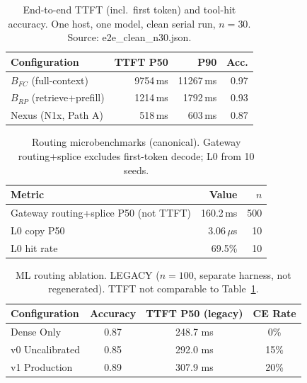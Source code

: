 %

\begin{table}[t]
\centering
\caption{End-to-end TTFT (incl.\ first token) and tool-hit accuracy. One host,
one model, clean serial run, $n{=}30$. Source: e2e\_clean\_n30.json.}
\label{tab:e2e-macro}
\begin{tabular}{lrrr}
\toprule
Configuration & TTFT P50 & P90 & Acc. \\
\midrule
$B_{FC}$ (full-context) & 9754\,ms & 11267\,ms & 0.97 \\
$B_{RP}$ (retrieve+prefill) & 1214\,ms & 1792\,ms & 0.93 \\
Nexus (N1x, Path A) & 518\,ms & 603\,ms & 0.87 \\
\bottomrule
\end{tabular}
\end{table}

\begin{table}[t]
\centering
\caption{Routing microbenchmarks (canonical). Gateway routing+splice excludes
first-token decode; L0 from 10 seeds.}
\label{tab:routing-micro}
\begin{tabular}{lrr}
\toprule
Metric & Value & $n$ \\
\midrule
Gateway routing+splice P50 (not TTFT) & 160.2\,ms & 500 \\
L0 copy P50 & 3.06\,$\mu$s & 10 \\
L0 hit rate & 69.5\% & 10 \\
\bottomrule
\end{tabular}
\end{table}

\begin{table}[t]
\centering
\caption{ML routing ablation. LEGACY ($n{=}100$, separate harness, not
regenerated). TTFT not comparable to Table~\ref{tab:e2e-macro}.}
\label{tab:ml-ablation}
\begin{tabular}{lccc}
\toprule
Configuration & Accuracy & TTFT P50 (legacy) & CE Rate \\
\midrule
Dense Only & 0.87 & 248.7 ms & 0\% \\
v0 Uncalibrated & 0.85 & 292.0 ms & 15\% \\
v1 Production & 0.89 & 307.9 ms & 20\% \\
\bottomrule
\end{tabular}
\end{table}

